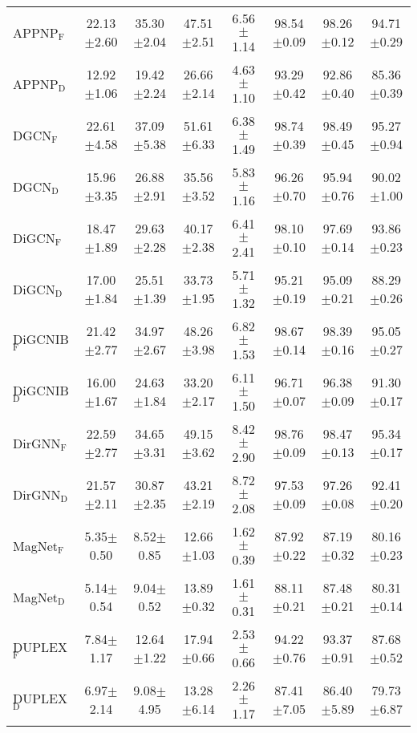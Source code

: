\begin{table}[h]
{\begin{tabular}{lccccccc}
        APPNP$_{\text{F}}$ & 22.13$\pm$2.60 & 35.30$\pm$2.04 & 47.51$\pm$2.51 & 6.56$\pm$1.14 & 98.54$\pm$0.09 & 98.26$\pm$0.12 & 94.71$\pm$0.29 \\ 
        APPNP$_{\text{D}}$& 12.92$\pm$1.06 & 19.42$\pm$2.24 & 26.66$\pm$2.14 & 4.63$\pm$1.10 & 93.29$\pm$0.42 & 92.86$\pm$0.40 & 85.36$\pm$0.39  \\ \midrule
        
        DGCN$_{\text{F}}$ & 22.61$\pm$4.58 & 37.09$\pm$5.38 & 51.61$\pm$6.33 & 6.38$\pm$1.49 & 98.74$\pm$0.39 & 98.49$\pm$0.45 & 95.27$\pm$0.94 \\
        DGCN$_{\text{D}}$ & 15.96$\pm$3.35 & 26.88$\pm$2.91 & 35.56$\pm$3.52 & 5.83$\pm$1.16 & 96.26$\pm$0.70 & 95.94$\pm$0.76 & 90.02$\pm$1.00 \\ \midrule

        DiGCN$_{\text{F}}$ & 18.47$\pm$1.89 & 29.63$\pm$2.28 & 40.17$\pm$2.38 & 6.41$\pm$2.41 & 98.10$\pm$0.10 & 97.69$\pm$0.14 & 93.86$\pm$0.23 \\
        DiGCN$_{\text{D}}$ & 17.00$\pm$1.84 & 25.51$\pm$1.39 & 33.73$\pm$1.95 & 5.71$\pm$1.32 & 95.21$\pm$0.19 & 95.09$\pm$0.21 & 88.29$\pm$0.26 \\ \midrule
        
        DiGCNIB$_{\text{F}}$ & 21.42$\pm$2.77 & 34.97$\pm$2.67 & 48.26$\pm$3.98 & 6.82$\pm$1.53 & 98.67$\pm$0.14 & 98.39$\pm$0.16 & 95.05$\pm$0.27 \\
        DiGCNIB$_{\text{D}}$ & 16.00$\pm$1.67 & 24.63$\pm$1.84 & 33.20$\pm$2.17 & 6.11$\pm$1.50 & 96.71$\pm$0.07 & 96.38$\pm$0.09 & 91.30$\pm$0.17 \\ \midrule
        
        DirGNN$_{\text{F}}$& 22.59$\pm$2.77 & 34.65$\pm$3.31 & 49.15$\pm$3.62 & 8.42$\pm$2.90 & 98.76$\pm$0.09 & 98.47$\pm$0.13 & 95.34$\pm$0.17 \\
        DirGNN$_{\text{D}}$ &21.57$\pm$2.11 & 30.87$\pm$2.35 & 43.21$\pm$2.19 & 8.72$\pm$2.08 & 97.53$\pm$0.09 & 97.26$\pm$0.08 & 92.41$\pm$0.20 \\ \midrule
        
        MagNet$_{\text{F}}$ & 5.35$\pm$0.50 & 8.52$\pm$0.85 & 12.66$\pm$1.03 & 1.62$\pm$0.39 & 87.92$\pm$0.22 & 87.19$\pm$0.32 & 80.16$\pm$0.23 \\
        MagNet$_{\text{D}}$ & 5.14$\pm$0.54 & 9.04$\pm$0.52 & 13.89$\pm$0.32 & 1.61$\pm$0.31 & 88.11$\pm$0.21 & 87.48$\pm$0.21 & 80.31$\pm$0.14 \\ \midrule
        
        DUPLEX$_{\text{F}}$ & 7.84$\pm$1.17 & 12.64$\pm$1.22 & 17.94$\pm$0.66 & 2.53$\pm$0.66 & 94.22$\pm$0.76 & 93.37$\pm$0.91 & 87.68$\pm$0.52 \\ 
        DUPLEX$_{\text{D}}$ & 6.97$\pm$2.14 & 9.08$\pm$4.95 & 13.28$\pm$6.14 & 2.26$\pm$1.17 & 87.41$\pm$7.05 & 86.40$\pm$5.89 & 79.73$\pm$6.87 \\
 \midrule


\end{tabular}}
\end{table}
